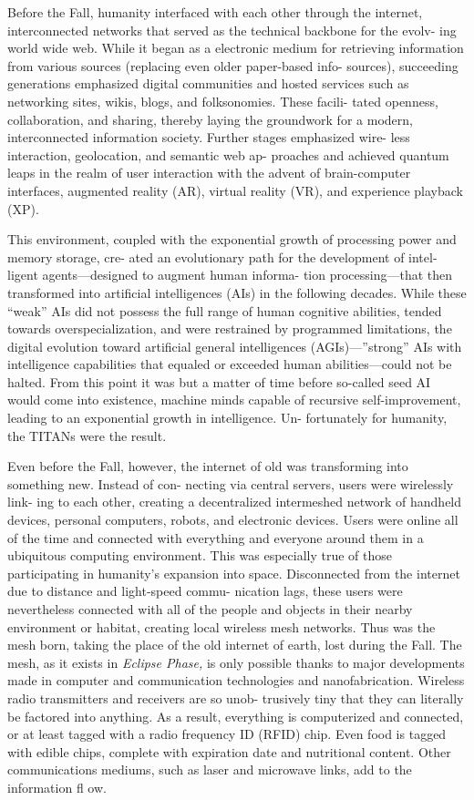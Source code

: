 Before the Fall, humanity interfaced with each other 
through the internet, interconnected networks that 
served as the technical backbone for the evolv-
ing world wide web. While it began as a electronic 
medium for retrieving information from various 
sources (replacing even older paper-based info-
sources), succeeding generations emphasized digital 
communities and hosted services such as networking 
sites, wikis, blogs, and folksonomies. These facili-
tated openness, collaboration, and sharing, thereby 
laying the groundwork for a modern, interconnected 
information society. Further stages emphasized wire-
less interaction, geolocation, and semantic web ap-
proaches and achieved quantum leaps in the realm 
of user interaction with the advent of brain-computer 
interfaces, augmented reality (AR), virtual reality 
(VR), and experience playback (XP).

This environment, coupled with the exponential 
growth of processing power and memory storage, cre-
ated an evolutionary path for the development of intel-
ligent agents—designed to augment human informa-
tion processing—that then transformed into artificial 
intelligences (AIs) in the following decades. While these 
``weak'' AIs did not possess the full range of human 
cognitive abilities, tended towards overspecialization, 
and were restrained by programmed limitations, the 
digital evolution toward artificial general intelligences 
(AGIs)—''strong'' AIs with intelligence capabilities 
that equaled or exceeded human abilities—could not 
be halted. From this point it was but a matter of time 
before so-called seed AI would come into existence, 
machine minds capable of recursive self-improvement, 
leading to an exponential growth in intelligence. Un-
fortunately for humanity, the TITANs were the result.

Even before the Fall, however, the internet of old 
was transforming into something new. Instead of con-
necting via central servers, users were wirelessly link-
ing to each other, creating a decentralized intermeshed 
network of handheld devices, personal computers, 
robots, and electronic devices. Users were online all of 
the time and connected with everything and everyone 
around them in a ubiquitous computing environment. 
This was especially true of those participating in 
humanity's expansion into space. Disconnected from 
the internet due to distance and light-speed commu-
nication lags, these users were nevertheless connected 
with all of the people and objects in their nearby 
environment or habitat, creating local wireless mesh 
networks. Thus was the mesh born, taking the place 
of the old internet of earth, lost during the Fall.
The mesh, as it exists in \textit{Eclipse Phase,} is only possible 
thanks to major developments made in computer and 
communication technologies and nanofabrication. 
Wireless radio transmitters and receivers are so unob-
trusively tiny that they can literally be factored into 
anything. As a result, everything is computerized and 
connected, or at least tagged with a radio frequency 
ID (RFID) chip. Even food is tagged with edible chips, 
complete with expiration date and nutritional content. 
Other communications mediums, such as laser and 
microwave links, add to the information fl ow.

